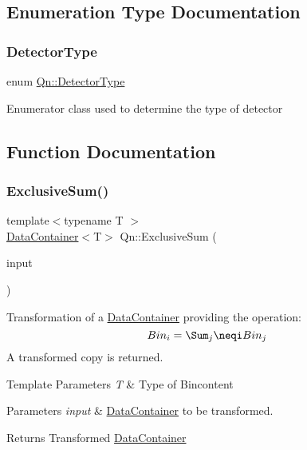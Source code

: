 \subsection{Enumeration Type Documentation}
\mbox{\label{namespaceQn_adba56b19bd9207127cdc7227d9e03a05}} 
\subsubsection{\texorpdfstring{Detector\+Type}{DetectorType}}
{\footnotesize\ttfamily enum \mbox{\hyperlink{namespaceQn_adba56b19bd9207127cdc7227d9e03a05}{Qn\+::\+Detector\+Type}}\hspace{0.3cm}{\ttfamily [strong]}}

Enumerator class used to determine the type of detector 

\subsection{Function Documentation}
\mbox{\label{namespaceQn_a1b9d91b6c7e55713ee9dfe893fd8e13a}} 
\subsubsection{\texorpdfstring{Exclusive\+Sum()}{ExclusiveSum()}}
{\footnotesize\ttfamily template$<$typename T $>$ \\
\mbox{\hyperlink{classQn_1_1DataContainer}{Data\+Container}}$<$T$>$ Qn\+::\+Exclusive\+Sum (\begin{DoxyParamCaption}\item[{const \mbox{\hyperlink{classQn_1_1DataContainer}{Data\+Container}}$<$ T $>$ \&}]{input }\end{DoxyParamCaption})}

Transformation of a \mbox{\hyperlink{classQn_1_1DataContainer}{Data\+Container}} providing the operation\+: \[ Bin_i=\Sum_j\neqi Bin_j \] A transformed copy is returned. 
\begin{DoxyTemplParams}{Template Parameters}
{\em T} & Type of Bincontent \\
\hline
\end{DoxyTemplParams}

\begin{DoxyParams}{Parameters}
{\em input} & \mbox{\hyperlink{classQn_1_1DataContainer}{Data\+Container}} to be transformed. \\
\hline
\end{DoxyParams}
\begin{DoxyReturn}{Returns}
Transformed \mbox{\hyperlink{classQn_1_1DataContainer}{Data\+Container}} 
\end{DoxyReturn}
\mbox{\label{namespaceQn_adfbbdb0bce6b19511f94ddbe2511ce16}} 
